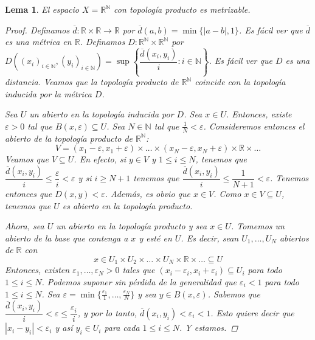 \documentclass[12pt]{book}
\newtheorem{lem}[teo]{Lema}
\theoremstyle{definition}
\newcommand{\RR}{\mathbb{R}}      %
\newcommand{\NN}{\mathbb{N}}
\begin{document}
\begin{lem}
El espacio $X=\RR^{\NN}$ con topología producto es metrizable.
\begin{proof}
Definamos $\overline{d}:\RR\times\RR\to\RR$ por $\overline{d}(a,b) = \min \{|a-b|,1\}$. Es fácil ver que $\overline{d}$ es una métrica en $\RR$. Definamos $D:\RR^\NN\times\RR^\NN$ por $D((x_i)_{i\in \NN}, (y_i)_{i\in\NN}) = \displaystyle\sup \left\{ \dfrac{\overline{d}(x_i,y_i)}{i} : i\in\NN \right\}$. Es fácil ver que $D$ es una distancia. Veamos que la topología producto de $\RR^\NN$ coincide con la topología inducida por la métrica $D$.

Sea $U$ un abierto en la topología inducida por $D$. Sea $x\in U$. Entonces, existe $\varepsilon>0$ tal que $B(x,\varepsilon)\subseteq U$. Sea $N\in\NN$ tal que $\frac{1}{N}<\varepsilon$. Consideremos entonces el abierto de la topología producto de $\RR^\NN$: $$V=(x_1-\varepsilon,x_1+\varepsilon)\times\ldots \times(x_N-\varepsilon,x_N+\varepsilon)\times\RR\times\ldots$$ Veamos que $V\subseteq U$. En efecto, si $y\in V$ y $1\leq i\leq N$, tenemos que $\dfrac{\overline{d}(x_i,y_i)}{i} \leq\dfrac{\varepsilon}{i}< \varepsilon$ y si $i\geq N+1$ tenemos que $\dfrac{\overline{d}(x_i,y_i)}{i}\leq\dfrac{1}{N+1}<\varepsilon$. Tenemos entonces que $D(x,y)<\varepsilon$. Además, es obvio que $x\in V$. Como $x\in V\subseteq U$, tenemos que $U$ es abierto en la topología producto.

Ahora, sea $U$ un abierto en la topología producto y sea $x\in U$. Tomemos un abierto de la base que contenga a $x$ y esté en $U$. Es decir, sean $U_1,\ldots , U_N$ abiertos de $\RR$ con $$ x\in U_1\times U_2\times\ldots \times U_N \times\RR\times\ldots\subseteq U$$ Entonces, existen $\varepsilon_1,\ldots , \varepsilon_N>0$ tales que $(x_i-\varepsilon_i,x_i+\varepsilon_i)\subseteq U_i$ para todo $1\leq i\leq N$. Podemos suponer sin pérdida de la generalidad que $\varepsilon_i <1$ para todo $1\leq i\leq N$. Sea $\varepsilon = \min\{\frac{\varepsilon_1}{1},\ldots , \frac{\varepsilon_N}{N}\}$ y sea $y\in B(x,\varepsilon)$.  Sabemos que $\dfrac{\overline{d}(x_i,y_i)}{i}<\varepsilon \leq \dfrac{\varepsilon_i}{i}$, y por lo tanto, $\overline{d}(x_i,y_i) < \varepsilon_i < 1$. Esto quiere decir que $|x_i-y_i|<\varepsilon_i$ y así $y_i\in U_i$ para cada $1\leq i \leq N$. Y estamos.
\end{proof}
\end{lem}
\end{document}
